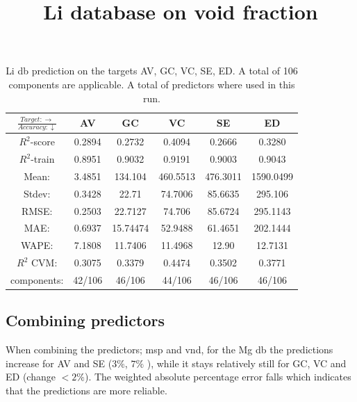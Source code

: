 \begin{table}[H]
\scriptsize
\centering
\caption{Li db prediction on the targets AV, GC, VC, SE, ED. A total of 106 components are applicable. A total of  predictors where used in this run.}
\title{Li database on void fraction}
\begin{tabular}{|c|c|c|c|c|c|}
	\hline 
	$\frac{Target: \rightarrow}{Accuracy:\downarrow} $ & AV & GC & VC & SE & ED 
	 \\ 
	\hline
	$R^2$-score & 0.2894 & 0.2732 & 0.4094 &  0.2666 &  0.3280\\ 
	\hline 
	$R^2$-train & 0.8951 &  0.9032 & 0.9191 &  0.9003 & 0.9043 \\ 
	\hline
	Mean: &3.4851	&134.104	&460.5513&476.3011&1590.0499\\
	\hline 
	Stdev:&0.3428&22.71	&74.7006	&85.6635	&295.106	\\
	\hline 
	RMSE: &0.2503& 22.7127 &  74.706 & 85.6724 & 295.1143 \\ 
	\hline
	MAE: & 0.6937 & 15.74474& 52.9488 &  61.4651 & 202.1444 \\ 
	\hline
	WAPE: & 7.1808 & 11.7406 & 11.4968  & 12.90 & 12.7131 \\
	\hline
	$R^2$ CVM: & 0.3075 & 0.3379 & 0.4474  & 0.3502 & 0.3771 \\
	\hline
	components: & 42/106 & 46/106 & 44/106  & 46/106 & 46/106 \\
	\hline
\end{tabular}
\label{tab:Li-APRDF2}
\end{table}


\subsection{Combining predictors} 
When combining the predictors; msp and vnd, for the Mg db the predictions increase for AV and SE ($3\%$, $7\%$ ), while it stays relatively still for GC, VC and ED (change $ < 2\%$). The weighted absolute percentage error falls which indicates that the predictions are more reliable.



